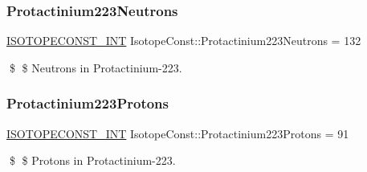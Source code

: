 \subsubsection{\texorpdfstring{Protactinium223\+Neutrons}{Protactinium223Neutrons}}
{\footnotesize\ttfamily \mbox{\hyperlink{group___isotope_const-_macros_ga5f18360b3e99483a35c32d789e62621c}{I\+S\+O\+T\+O\+P\+E\+C\+O\+N\+S\+T\+\_\+\+I\+NT}} Isotope\+Const\+::\+Protactinium223\+Neutrons = 132}

\$ \$ Neutrons in Protactinium-\/223. \mbox{\label{group___isotope_const-_protactinium-_pa223_gaaab327f6824ba4d170518702890a8bde}} 
\subsubsection{\texorpdfstring{Protactinium223\+Protons}{Protactinium223Protons}}
{\footnotesize\ttfamily \mbox{\hyperlink{group___isotope_const-_macros_ga5f18360b3e99483a35c32d789e62621c}{I\+S\+O\+T\+O\+P\+E\+C\+O\+N\+S\+T\+\_\+\+I\+NT}} Isotope\+Const\+::\+Protactinium223\+Protons = 91}

\$ \$ Protons in Protactinium-\/223. 